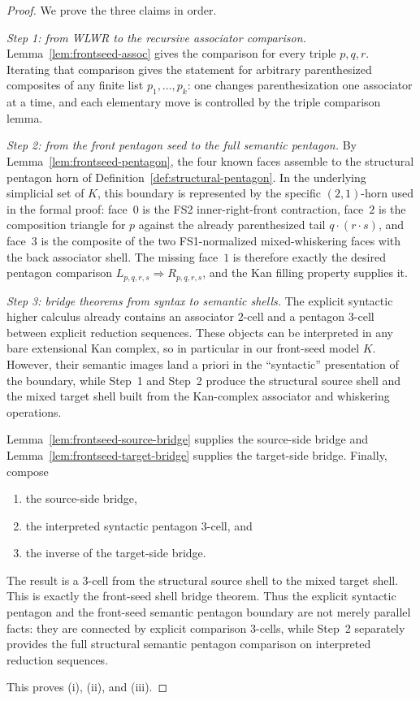 \documentclass[webpdf,traditional,large,numbered]{oup-authoring-template}
\theoremstyle{thmstyleone}%
\theoremstyle{thmstyletwo}%
\theoremstyle{thmstylethree}%
\begin{document}
\begin{proof}
We prove the three claims in order.

\smallskip
\noindent
\emph{Step 1: from WLWR to the recursive associator comparison.}
Lemma~\ref{lem:frontseed-assoc} gives the comparison for every triple
$p,q,r$.  Iterating that comparison gives the statement for arbitrary
parenthesized composites of any finite list $p_1,\dots,p_k$: one changes
parenthesization one associator at a time, and each elementary move is
controlled by the triple comparison lemma.

\smallskip
\noindent
\emph{Step 2: from the front pentagon seed to the full semantic pentagon.}
By Lemma~\ref{lem:frontseed-pentagon}, the four known faces assemble to the
structural pentagon horn of Definition~\ref{def:structural-pentagon}.  In the
underlying simplicial set of $K$, this boundary is represented by the specific
\((2,1)\)-horn used in the formal proof: face~$0$ is the FS2 inner-right-front
contraction, face~$2$ is the composition triangle for $p$ against the already
parenthesized tail $q\cdot(r\cdot s)$, and face~$3$ is the composite of the two
FS1-normalized mixed-whiskering faces with the back associator shell.  The
missing face~$1$ is therefore exactly the desired pentagon comparison
$L_{p,q,r,s}\Rightarrow R_{p,q,r,s}$, and the Kan filling property supplies it.

\smallskip
\noindent
\emph{Step 3: bridge theorems from syntax to semantic shells.}
The explicit syntactic higher calculus already contains an associator $2$-cell
and a pentagon $3$-cell between explicit reduction sequences.  These objects can
be interpreted in any bare extensional Kan complex, so in particular in our
front-seed model $K$.  However, their semantic images land a priori in the
``syntactic'' presentation of the boundary, while Step~1 and Step~2 produce the
structural source shell and the mixed target shell built from the Kan-complex
associator and whiskering operations.

Lemma~\ref{lem:frontseed-source-bridge} supplies the source-side bridge and
Lemma~\ref{lem:frontseed-target-bridge} supplies the target-side bridge.
Finally, compose
\begin{enumerate}[label=(\alph*)]
  \item the source-side bridge,
  \item the interpreted syntactic pentagon $3$-cell, and
  \item the inverse of the target-side bridge.
\end{enumerate}
The result is a $3$-cell from the structural source shell to the mixed target
shell.  This is exactly the front-seed shell bridge theorem.  Thus the explicit
syntactic pentagon and the front-seed semantic pentagon boundary are not merely
parallel facts: they are connected by explicit comparison $3$-cells, while
Step~2 separately provides the full structural semantic pentagon comparison on
interpreted reduction sequences.

This proves (i), (ii), and (iii).
\end{proof}
\end{document}
